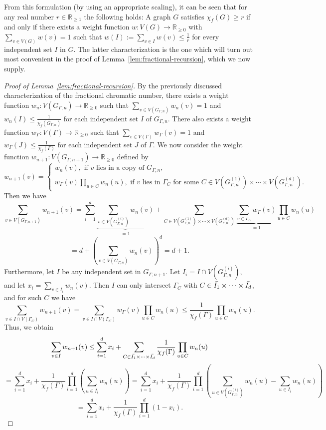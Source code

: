 \documentclass[10pt]{amsart}
\theoremstyle{definition}
\newcommand{\RR}{\mathbb{R}}
\begin{document}
From this formulation (by using an appropriate scaling), it can be seen that for any real number $r\in \mathbb{R}_{\ge 1}$ the following holds: A graph $G$ satisfies $\chi_f(G)\ge r$ if and only if there exists a weight function $w:V(G)\rightarrow \mathbb{R}_{\ge 0}$ with $\sum_{v\in V(G)}{w(v)}=1$ such that $w(I):=\sum_{v\in I}{w(v)}\le \frac{1}{r}$ for every independent set $I$ in $G$. The latter characterization is the one which will turn out most convenient in the proof of Lemma~\ref{lem:fractional-recursion}, which we now supply.\begin{proof}[Proof of Lemma~\ref{lem:fractional-recursion}]
    By the previously discussed characterization of the fractional chromatic number, there exists a weight function $w_n: V(G_{\Gamma, n}) \to \RR_{\geq 0}$ such that $\sum_{v \in V(G_{\Gamma, n})} w_n(v) = 1$ and $w_n(I) \leq \frac{1}{\chi_f(G_{\Gamma, n})}$ for each independent set $I$ of $G_{\Gamma, n}$. There also exists a weight function $w_{\Gamma}: V(\Gamma) \to \RR_{\geq 0}$ such that $\sum_{v \in V(\Gamma)} w_\Gamma(v) = 1$ and $w_\Gamma(J) \leq \frac{1}{\chi_f(\Gamma)}$ for each independent set $J$ of $\Gamma$. We now consider the weight function $w_{n + 1}: V(G_{\Gamma, n + 1}) \to \RR_{\geq 0}$ defined by
    $$w_{n + 1}(v) = \begin{cases}
    w_n(v), \text{ if } v \text{ lies in a copy of $G_{\Gamma, n}$,} \\
    w_\Gamma(v) \prod_{u \in C} w_n(u), \text{ if }v \text{ lies in $\Gamma_C$ for some $C\in V(G_{\Gamma,n}^{(1)})\times\cdots\times V(G_{\Gamma,n}^{(d)})$}.
    \end{cases}$$
    Then we have
    $$\sum_{v \in V(G_{\Gamma, n + 1})} w_{n + 1}(v) = \sum_{i = 1}^d \underbrace{\sum_{v \in V(G_{\Gamma, n}^{(i)})} w_n(v)}_{=1} + \sum_{C \in V(G^{(1)}_{\Gamma, n}) \times \cdots \times V(G^{(d)}_{\Gamma, n})} \underbrace{\sum_{v \in \Gamma_C} w_\Gamma(v)}_{=1} \prod_{u \in C} w_n(u)$$
    $$=d+\left(\sum_{v\in V(G_{\Gamma,n})}w_n(v)\right)^d=d+1.$$
    Furthermore, let $I$ be any independent set in $G_{\Gamma, n + 1}$. Let $I_i = I \cap V(G_{\Gamma, n}^{(i)})$, and let $x_i = \sum_{v \in I_i} w_n(v)$. Then $I$ can only intersect $\Gamma_C$ with $C \in \Bar{I_1} \times \cdots \times \Bar{I_d}$, and for such $C$ we have
    $$\sum_{v \in I \cap V(\Gamma_C)} w_{n + 1}(v) = \sum_{v \in I \cap V(\Gamma_C)} w_\Gamma(v) \prod_{u \in C} w_n(u) \leq \frac{1}{\chi_f(\Gamma)} \prod_{u \in C} w_n(u).$$
    Thus, we obtain
    $$\sum_{v \in I} w_{n + 1}(v) \leq \sum_{i = 1}^{d} x_i + \sum_{C \in \Bar{I_1} \times \cdots \times \Bar{I_d}} \frac{1}{\chi_f(\Gamma)} \prod_{u \in C} w_n(u) $$ $$= \sum_{i=1}^{d}x_i+\frac{1}{\chi_f(\Gamma)}\prod_{i=1}^{d} \left(\sum_{u\in \bar{I_i}}w_n(u)\right)=\sum_{i=1}^{d}x_i+\frac{1}{\chi_f(\Gamma)}\prod_{i=1}^{d}\left(\sum_{u\in V(G_{\Gamma,n}^{(i)})}w_n(u)-\sum_{u\in I_i}w_n(u)\right)$$ $$= \sum_{i = 1}^d x_i +  \frac{1}{\chi_f(\Gamma)} \prod_{i = 1}^d (1 - x_i).$$

\end{proof}
\end{document}
